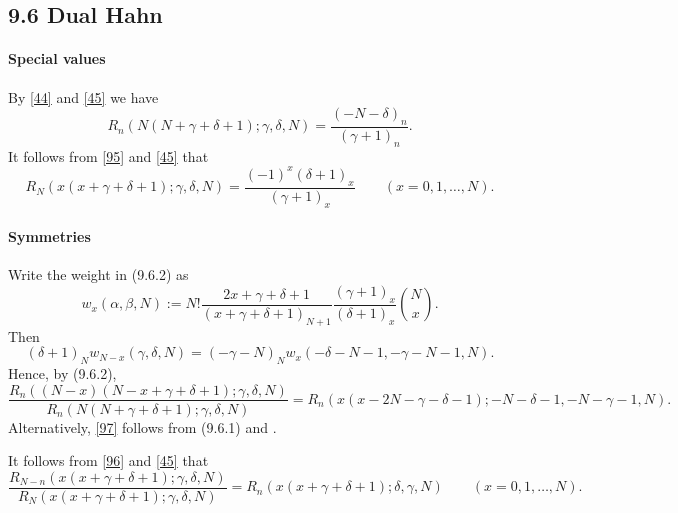 \documentclass[twoside,11pt]{article}
\newcommand\al\alpha
\newcommand\be\beta
\newcommand\ga\gamma
\newcommand\de\delta
\begin{document}
\subsection*{9.6 Dual Hahn}
\label{sec9.6}
%
\paragraph{Special values}
By \eqref{44} and \eqref{45} we have
\begin{equation}
R_n(N(N+\ga+\de+1);\ga,\de,N)=\frac{(-N-\de)_n}{(\ga+1)_n} .
\label{47}
\end{equation}
It follows from \eqref{95} and \eqref{45} that
\begin{equation}
R_N(x(x+\ga+\de+1);\ga,\de,N)
=\frac{(-1)^x(\de+1)_x}{(\ga+1)_x}\qquad(x=0,1,\ldots,N).
\label{101}
\end{equation}
%
\paragraph{Symmetries}
Write the weight in (9.6.2) as
\begin{equation}
w_x(\al,\be,N):=N! \frac{2x+\ga+\de+1}{(x+\ga+\de+1)_{N+1}} 
\frac{(\ga+1)_x}{(\de+1)_x} \binom Nx.
\label{98}
\end{equation}
Then
\begin{equation}
(\de+1)_N w_{N-x}(\ga,\de,N)=
(-\ga-N)_N w_x(-\de-N-1,-\ga-N-1,N).
\label{99}
\end{equation}
Hence, by (9.6.2),
\begin{equation}
\frac{R_n((N-x)(N-x+\ga+\de+1);\ga,\de,N)}{R_n(N(N+\ga+\de+1);\ga,\de,N)}
=R_n(x(x-2N-\ga-\de-1);-N-\de-1,-N-\ga-1,N).
\label{97}
\end{equation}
Alternatively, \eqref{97} follows from (9.6.1) and
.

It follows from \eqref{96} and \eqref{45} that
\begin{equation}
\frac{R_{N-n}(x(x+\ga+\de+1);\ga,\de,N)}
{R_N(x(x+\ga+\de+1);\ga,\de,N)}
=R_n(x(x+\ga+\de+1);\de,\ga,N)\qquad(x=0,1,\ldots,N).
\label{102}
\end{equation}
%
\end{document}
